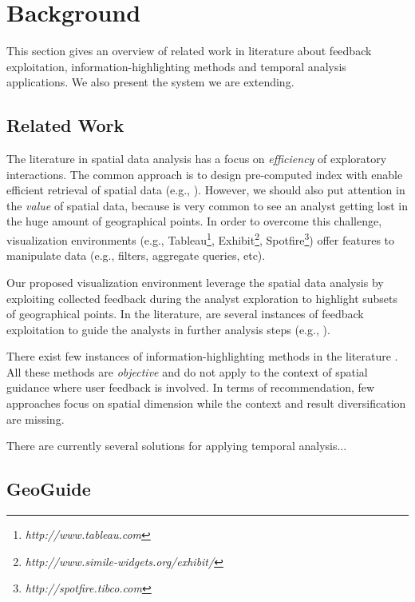 \chapter{Background}
\label{chap:background}

This section gives an overview of related work in literature about feedback exploitation, information-highlighting methods and temporal analysis applications. We also present the system we are extending.

\section{Related Work}

The literature in spatial data analysis has a focus on {\em efficiency} of exploratory interactions. The common approach is to design pre-computed index with enable efficient retrieval of spatial data (e.g., \cite{lins2013nanocubes}). However,
we should also put attention in the {\em value} of spatial data, because is very common to see an analyst getting lost in the huge amount of geographical points. In order to overcome this challenge, visualization environments (e.g., Tableau\footnote{\it http://www.tableau.com}, Exhibit\footnote{\it http://www.simile-widgets.org/exhibit/}, Spotfire\footnote{\it  http://spotfire.tibco.com}) offer features to manipulate data (e.g., filters, aggregate queries, etc).

Our proposed visualization environment leverage the spatial data analysis by exploiting collected feedback during the analyst exploration to highlight subsets of geographical points. In the literature, are several instances of feedback exploitation to guide the analysts in further analysis steps (e.g., \cite{boley2013one}).

There exist few instances of information-highlighting methods in the literature \cite{Liang2010,Robinson2011,wongsuphasawat2016voyager,willett2007scented}. All these methods are {\em objective} and do not apply to the context of spatial guidance where user feedback is involved.  In terms of recommendation, few approaches focus on spatial dimension \cite{Bao2015,Levandoski:2012} while the context and result diversification are missing.

There are currently several solutions for applying temporal analysis...

\section{GeoGuide}

